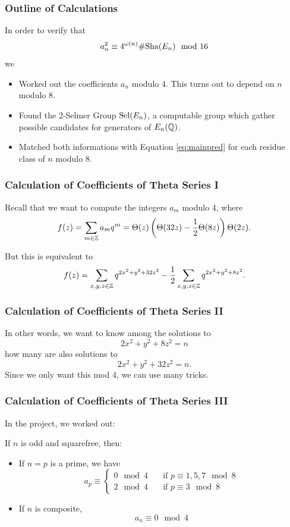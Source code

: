 \documentclass{beamer}
\begin{document}
\begin{frame}
  \frametitle{Outline of Calculations}
  In order to verify that
  \begin{equation} \label{eq:mainpred}
    a_n^2 \equiv 4^{\omega(n)} \# \text{\normalfont Sha}(E_n) \mod{16}
  \end{equation}
  we
  \begin{itemize}
  \item Worked out the coefficients $a_n$ modulo 4. This turns out to
    depend on $n$ modulo 8. \pause
  \item Found the 2-Selmer Group $\text{\normalfont Sel}(E_n)$, a computable group which gather
    possible candidates for generators of $E_n({\mathbb Q})$. \pause
  \item Matched both informations with Equation \autoref{eq:mainpred}
    for each residue class
    of $n$ modulo 8.
  \end{itemize}
\end{frame}

\begin{frame}
  \frametitle{Calculation of Coefficients of Theta Series I}
  Recall that we want to compute the integers $a_m$ modulo 4, where
    \[f(z) = \sum\limits_{m \in {\mathbb Z}} a_m q^m = \Theta(z) \left( \Theta(32z)
      - \frac{1}{2}\Theta(8z)\right) \Theta(2z).\] \pause

  But this is equivalent to 
  \[f(z) = \sum\limits_{x,y,z \in {\mathbb Z}} q^{2x^2 + y^2 + 32z^2} - \frac{1}{2}
  \sum\limits_{x,y,z \in {\mathbb Z}} q^{2x^2 + y^2 + 8z^2}.\] 
\end{frame}

\begin{frame}
  \frametitle{Calculation of Coefficients of Theta Series II}
  In other words, we want to know among the solutions to
  \[2x^2 + y^2 + 8z^2 = n\]
  how many are also solutions to
  \[2x^2 + y^2 + 32z^2 = n. \] 
  Since we only want this mod 4, we can use many tricks.
\end{frame}

\begin{frame}
  \frametitle{Calculation of Coefficients of Theta Series III}

  In the project, we worked out:
  \begin{theorem}
    If $n$ is odd and squarefree, then:
    \begin{itemize}
    \item If $n = p$ is a prime, we have
      \[a_p \equiv
        \begin{cases}
          0 \mod 4 \quad &\text{if } p \equiv 1,5,7 \mod 8 \\
          2 \mod 4 \quad &\text{if } p \equiv 3 \mod 8
        \end{cases}
      \] 
    \item If $n$ is composite,
      \[a_n \equiv 0 \mod{4}\]
    \end{itemize}
  \end{theorem}
\end{frame}
\end{document}
